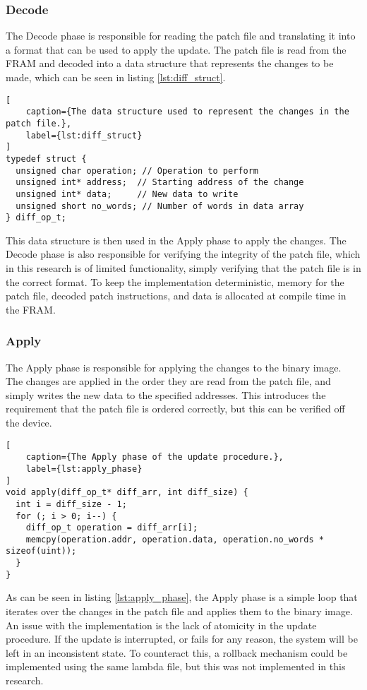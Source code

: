 \subsubsection*{Decode}
The Decode phase is responsible for reading the patch file and translating it into a format that can be used to apply the update. The patch file is read from the FRAM and decoded into a data structure that represents the changes to be made, which can be seen in listing \ref{lst:diff_struct}. 
\begin{lstlisting}[
    caption={The data structure used to represent the changes in the patch file.},
    label={lst:diff_struct}
]
typedef struct {
  unsigned char operation; // Operation to perform
  unsigned int* address;  // Starting address of the change
  unsigned int* data;     // New data to write
  unsigned short no_words; // Number of words in data array
} diff_op_t;
\end{lstlisting}
This data structure is then used in the Apply phase to apply the changes. The Decode phase is also responsible for verifying the integrity of the patch file, which in this research is of limited functionality, simply verifying that the patch file is in the correct format. To keep the implementation deterministic, memory for the patch file, decoded patch instructions, and data is allocated at compile time in the FRAM.

\subsubsection*{Apply}
The Apply phase is responsible for applying the changes to the binary image. The changes are applied in the order they are read from the patch file, and simply writes the new data to the specified addresses. This introduces the requirement that the patch file is ordered correctly, but this can be verified off the device. 

\begin{lstlisting}[
    caption={The Apply phase of the update procedure.},
    label={lst:apply_phase}
]
void apply(diff_op_t* diff_arr, int diff_size) {
  int i = diff_size - 1;
  for (; i > 0; i--) {
    diff_op_t operation = diff_arr[i];
    memcpy(operation.addr, operation.data, operation.no_words * sizeof(uint));
  }
}
\end{lstlisting}

As can be seen in listing \ref{lst:apply_phase}, the Apply phase is a simple loop that iterates over the changes in the patch file and applies them to the binary image. An issue with the implementation is the lack of atomicity in the update procedure. If the update is interrupted, or fails for any reason, the system will be left in an inconsistent state. To counteract this, a rollback mechanism could be implemented using the same lambda file, but this was not implemented in this research.
